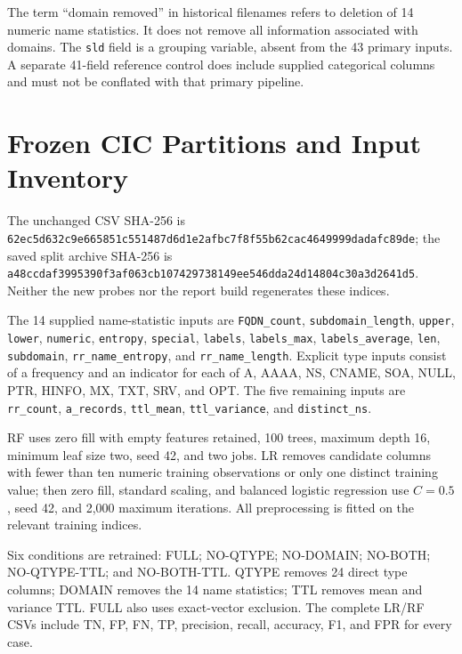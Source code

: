 \documentclass[conference]{IEEEtran}
\newcommand{\code}[1]{\texttt{#1}}
\begin{document}
The term ``domain removed'' in historical filenames refers to deletion of 14 numeric name statistics. It does not remove all information associated with domains. The \code{sld} field is a grouping variable, absent from the 43 primary inputs. A separate 41-field reference control does include supplied categorical columns and must not be conflated with that primary pipeline.

\section{Frozen CIC Partitions and Input Inventory}
\begin{table}[t]
\caption{All frozen CIC partitions. Shared vectors counts distinct complete 41-field nonlabel vectors, whereas repeated test-row counts are measured separately. GROUP folds hold out exact coarse tokens, not validated registered domains.}

\end{table}
The unchanged CSV SHA-256 is \nolinkurl{62ec5d632c9e665851c551487d6d1e2afbc7f8f55b62cac4649999dadafc89de}; the saved split archive SHA-256 is \nolinkurl{a48ccdaf3995390f3af063cb107429738149ee546dda24d14804c30a3d2641d5}. Neither the new probes nor the report build regenerates these indices.

The 14 supplied name-statistic inputs are \code{FQDN\_count}, \code{subdomain\_length}, \code{upper}, \code{lower}, \code{numeric}, \code{entropy}, \code{special}, \code{labels}, \code{labels\_max}, \code{labels\_average}, \code{len}, \code{subdomain}, \code{rr\_name\_entropy}, and \code{rr\_name\_length}. Explicit type inputs consist of a frequency and an indicator for each of A, AAAA, NS, CNAME, SOA, NULL, PTR, HINFO, MX, TXT, SRV, and OPT. The five remaining inputs are \code{rr\_count}, \code{a\_records}, \code{ttl\_mean}, \code{ttl\_variance}, and \code{distinct\_ns}.

RF uses zero fill with empty features retained, 100 trees, maximum depth 16, minimum leaf size two, seed 42, and two jobs. LR removes candidate columns with fewer than ten numeric training observations or only one distinct training value; then zero fill, standard scaling, and balanced logistic regression use $C=0.5$, seed 42, and 2,000 maximum iterations. All preprocessing is fitted on the relevant training indices.

Six conditions are retrained: FULL; NO-QTYPE; NO-DOMAIN; NO-BOTH; NO-QTYPE-TTL; and NO-BOTH-TTL. QTYPE removes 24 direct type columns; DOMAIN removes the 14 name statistics; TTL removes mean and variance TTL. FULL also uses exact-vector exclusion. The complete LR/RF CSVs include TN, FP, FN, TP, precision, recall, accuracy, F1, and FPR for every case.
\end{document}
